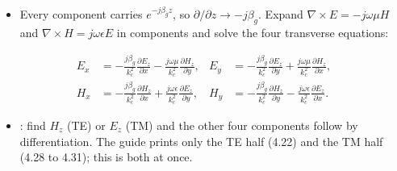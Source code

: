 \par{}
\begin{itemize}
  \item Every component carries $e^{-j\beta_g z}$, so $\partial/\partial z \rightarrow -j\beta_g$.
    Expand $\nabla\times E = -j\omega\mu H$ and $\nabla\times H = j\omega\epsilon E$ in
    components and solve the four transverse equations:
\end{itemize}
\[
\begin{aligned}
E_x &= -\frac{j\beta_g}{k_c^2}\frac{\partial E_z}{\partial x} - \frac{j\omega\mu}{k_c^2}\frac{\partial H_z}{\partial y}, &
E_y &= -\frac{j\beta_g}{k_c^2}\frac{\partial E_z}{\partial y} + \frac{j\omega\mu}{k_c^2}\frac{\partial H_z}{\partial x}, \\[3pt]
H_x &= -\frac{j\beta_g}{k_c^2}\frac{\partial H_z}{\partial x} + \frac{j\omega\epsilon}{k_c^2}\frac{\partial E_z}{\partial y}, &
H_y &= -\frac{j\beta_g}{k_c^2}\frac{\partial H_z}{\partial y} - \frac{j\omega\epsilon}{k_c^2}\frac{\partial E_z}{\partial x}.
\end{aligned}
\]
\begin{itemize}
  \item {}: find $H_z$ (TE) or $E_z$ (TM) and the other four
    components follow by differentiation. The guide prints only the TE half (4.22) and the TM
    half (4.28 to 4.31); this is both at once.
\end{itemize}


